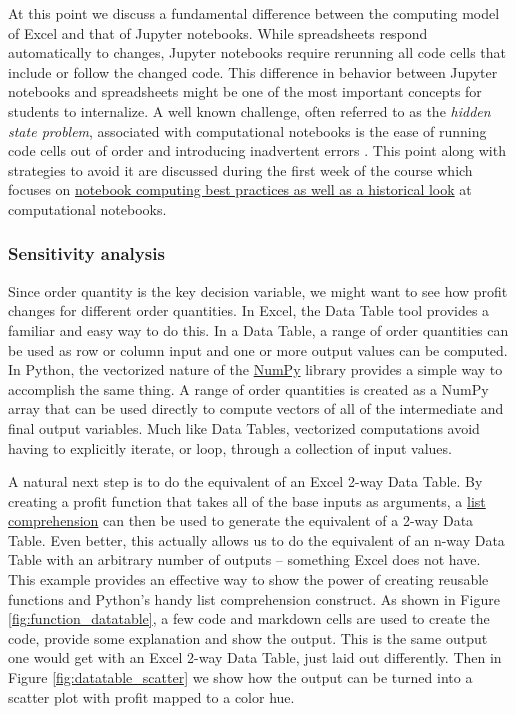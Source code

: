 \documentclass[ited,blindrev]{informs3}              %
\begin{document}
At this point we discuss a fundamental difference between the computing model of Excel and that of Jupyter notebooks. While spreadsheets respond automatically to changes, Jupyter notebooks require rerunning all code cells that include or follow the changed code. This difference in behavior between Jupyter notebooks and spreadsheets might be one of the most important concepts for students to internalize. A well known challenge, often referred to as the \textit{hidden state problem}, associated with computational notebooks is the ease of running code cells out of order and introducing inadvertent errors \cite{johnson2020benefits,grusDonNotebooks2018}. This point along with strategies to avoid it are discussed during the first week of the course which focuses on \href{http://www.sba.oakland.edu/faculty/isken/courses/aap/jupyter_notebooks.html}{notebook computing best practices as well as a historical look} at computational notebooks.

\subsubsection{Sensitivity analysis}

Since order quantity is the key decision variable, we might want to see how profit changes for different order quantities. In Excel, the Data Table tool provides a familiar and easy way to do this. In a Data Table, a range of order quantities can be used as row or column input and one or more output values can be computed. In Python, the vectorized nature of the \href{https://numpy.org/}{NumPy} library \cite{harris2020array} provides a simple way to accomplish the same thing. A range of order quantities is created as a NumPy array that can be used directly to compute vectors of all of the intermediate and final output variables. Much like Data Tables, vectorized computations avoid having to explicitly iterate, or loop, through a collection of input values.

A natural next step is to do the equivalent of an Excel 2-way Data Table. By creating a profit function that takes all of the base inputs as arguments, a \href{https://realpython.com/list-comprehension-python/}{list comprehension} can then be used to generate the equivalent of a 2-way Data Table. Even better, this actually allows us to do the equivalent of an n-way Data Table with an arbitrary number of outputs -- something Excel does not have. This example provides an effective way to show the power of creating reusable functions and Python's handy list comprehension construct. As shown in Figure \ref{fig:function_datatable}, a few code and markdown cells are used to create the code, provide some explanation and show the output. This is the same output one would get with an Excel 2-way Data Table, just laid out differently. Then in Figure \ref{fig:datatable_scatter} we show how the output can be turned into a scatter plot with profit mapped to a color hue.
\end{document}
